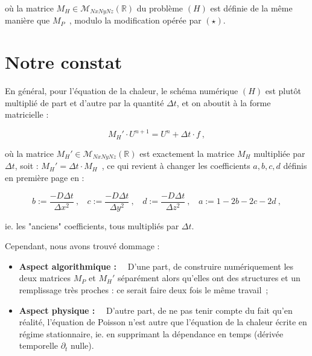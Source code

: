 \documentclass[12pt]{article}
\def \RR {\mathbb{R}}
\def \sM {\mathcal{M}}
\begin{document}
\noindent
où la matrice $M_H \in \sM_{NxNyNz} (\RR)$ du problème $(H)$ est définie de la même manière que $M_P$~, modulo la modification opérée par $(\star)$.

\vspace{10 mm}

\section{Notre constat}

\noindent
En général, pour l'équation de la chaleur, le schéma numérique $(H)$ est plutôt multiplié de part et d'autre par la quantité $\Delta t$, et on aboutit à la forme matricielle :

$$M_H' \cdot U^{n+1} = U^n + \Delta t \cdot f~,$$

\vspace{5 mm}

\noindent
où la matrice $M_H' \in \sM_{NxNyNz} (\RR)$ est exactement la matrice $M_H$ multipliée par $\Delta t$, soit : $M_H' = \Delta t \cdot M_H$~, ce qui revient à changer les coefficients $a, b, c, d$ définis en première page en :

$$b := \frac{-D\Delta t}{\Delta x^2}~,~~~~ c := \frac{-D\Delta t}{\Delta y^2}~,~~~~ d := \frac{-D\Delta t}{\Delta z^2}~,~~~~ a := 1 - 2b - 2c - 2d~,$$

\vspace{5 mm}

\noindent
ie. les "anciens" coefficients, tous multipliés par $\Delta t$.

\vspace{5 mm}

\noindent
Cependant, nous avons trouvé dommage :

\vspace{5 mm}

\noindent
\begin{itemize}
	\item \textbf{Aspect algorithmique :}~~ D'une part, de construire numériquement les deux matrices $M_P$ et $M_H'$ séparément alors qu'elles ont des structures et un remplissage très proches : ce serait faire deux fois le même travail~;

\vspace{5 mm}

	\item \textbf{Aspect physique :}~~ D'autre part, de ne pas tenir compte du fait qu'en réalité, l'équation de Poisson n'est autre que l'équation de la chaleur écrite en régime stationnaire, ie. en supprimant la dépendance en temps (dérivée temporelle $\partial_t$ nulle).
\end{itemize}
\end{document}

